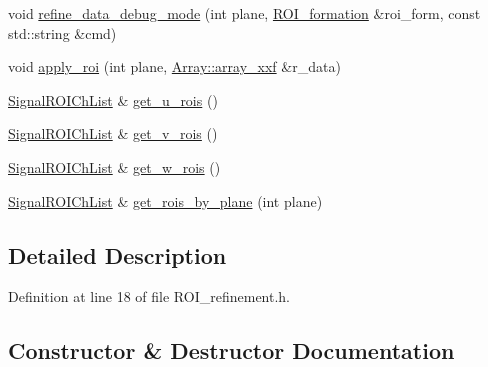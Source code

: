 \begin{DoxyCompactItemize}
\item 
void \hyperlink{class_wire_cell_1_1_sig_proc_1_1_r_o_i__refinement_ab63807936f9a429bf0d97b133068bd4a}{refine\+\_\+data\+\_\+debug\+\_\+mode} (int plane, \hyperlink{class_wire_cell_1_1_sig_proc_1_1_r_o_i__formation}{R\+O\+I\+\_\+formation} \&roi\+\_\+form, const std\+::string \&cmd)
\item 
void \hyperlink{class_wire_cell_1_1_sig_proc_1_1_r_o_i__refinement_ad9fa04700e5990b6f2dee69eaefdaf49}{apply\+\_\+roi} (int plane, \hyperlink{namespace_wire_cell_1_1_array_ab565fef5e33632bb02f0ed4be803020c}{Array\+::array\+\_\+xxf} \&r\+\_\+data)
\item 
\hyperlink{namespace_wire_cell_1_1_sig_proc_a5b3db127bb7fb1e16d93fa60f52905af}{Signal\+R\+O\+I\+Ch\+List} \& \hyperlink{class_wire_cell_1_1_sig_proc_1_1_r_o_i__refinement_a9b1debf14ee8bae2c9a558da5308cfb3}{get\+\_\+u\+\_\+rois} ()
\item 
\hyperlink{namespace_wire_cell_1_1_sig_proc_a5b3db127bb7fb1e16d93fa60f52905af}{Signal\+R\+O\+I\+Ch\+List} \& \hyperlink{class_wire_cell_1_1_sig_proc_1_1_r_o_i__refinement_abd0825bd27e31785fd255c90fab25df6}{get\+\_\+v\+\_\+rois} ()
\item 
\hyperlink{namespace_wire_cell_1_1_sig_proc_a5b3db127bb7fb1e16d93fa60f52905af}{Signal\+R\+O\+I\+Ch\+List} \& \hyperlink{class_wire_cell_1_1_sig_proc_1_1_r_o_i__refinement_a2a9a05d4936bffcc0946a2e7190d3112}{get\+\_\+w\+\_\+rois} ()
\item 
\hyperlink{namespace_wire_cell_1_1_sig_proc_a5b3db127bb7fb1e16d93fa60f52905af}{Signal\+R\+O\+I\+Ch\+List} \& \hyperlink{class_wire_cell_1_1_sig_proc_1_1_r_o_i__refinement_afd5ab2626265ce9d6efd309bfeec3639}{get\+\_\+rois\+\_\+by\+\_\+plane} (int plane)
\end{DoxyCompactItemize}


\subsection{Detailed Description}


Definition at line 18 of file R\+O\+I\+\_\+refinement.\+h.



\subsection{Constructor \& Destructor Documentation}
\mbox{\label{class_wire_cell_1_1_sig_proc_1_1_r_o_i__refinement_ad7b2030a624f7cc8753c028696792bb9}} 
